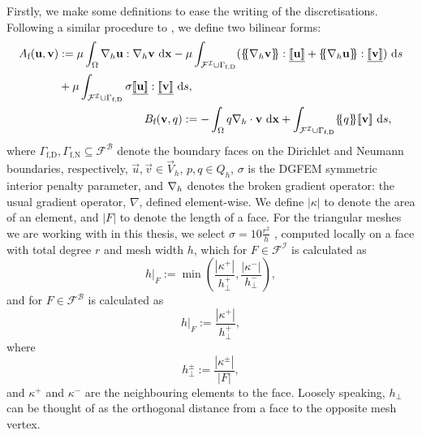             Firstly, we make some definitions to ease the writing of the discretisations. Following a similar procedure to \cite{cockburnLocallyConservativeLDG2004,cliffeAdaptiveDiscontinuousGalerkin2010,gianiGoalorientedAdaptiveComposite2014}, we define two bilinear forms:
            \begin{align}
                \begin{split}
                    A_\text{f}(\vec{u}, \vec{v}) & := \mu \int_\Omega \nablab \vec{u} : \nablab \vec{v} \diff\vec{x} - \mu \int_{\mathcal{F}^\mathcal{I} \cup \Gamma_\text{f,D}} (\average{\nablab \vec{v}} : \jumpvec{\vec{u}} + \average{\nablab \vec{u}} : \jumpvec{\vec{v}}) \diff s \\ & + \mu \int_{\mathcal{F}^\mathcal{I} \cup \Gamma_\text{f,D}} \sigma \jumpvec{\vec{u}} : \jumpvec{\vec{v}} \diff s,
                \end{split}\\
                \begin{split}
                    B_\text{f}(\vec{v}, q) & := -\int_\Omega q \nablab \cdot \vec{v} \diff\vec{x} + \int_{\mathcal{F}^\mathcal{I} \cup \Gamma_\text{f,D}} \average{q} \jump{\vec{v}} \diff s,
                \end{split}
            \end{align}
            where $\Gamma_\text{f,D}, \Gamma_\text{f,N} \subseteq \mathcal{F}^\mathcal{B}$ denote the boundary faces on the Dirichlet and Neumann boundaries, respectively, $\vec{u}, \vec{v} \in \vec{V}_h$, $p, q \in Q_h$, $\sigma$ is the DGFEM symmetric interior penalty parameter, and $\nabla_h$ denotes the broken gradient operator: the usual gradient operator, $\nabla$, defined element-wise. We define $|\kappa|$ to denote the area of an element, and $|F|$ to denote the length of a face. For the triangular meshes we are working with in this thesis, we select $\sigma = 10 \frac{r^2}{h}$ \cite{cangianiHpVersionDiscontinuousGalerkin2017, houstonEnergyNormShape2005, houstonAutomaticSymbolicComputation2018}, computed locally on a face with total degree $r$ and mesh width $h$, which for $F \in \mathcal{F}^\mathcal{I}$ is calculated as
            \begin{equation*}
                h|_F := \min \left( \frac{|\kappa^+|}{h^+_\perp}, \frac{|\kappa^-|}{h^-_\perp} \right),
            \end{equation*}
            and for $F \in \mathcal{F}^\mathcal{B}$ is calculated as
            \begin{equation*}
                h|_F := \frac{|\kappa^+|}{h^+_\perp},
            \end{equation*}
            where
            \begin{equation*}
                h^\pm_\perp := \frac{|\kappa^\pm|}{|F|},
            \end{equation*}
            and $\kappa^+$ and $\kappa^-$ are the neighbouring elements to the face. Loosely speaking, $h_\perp$ can be thought of as the orthogonal distance from a face to the opposite mesh vertex.

